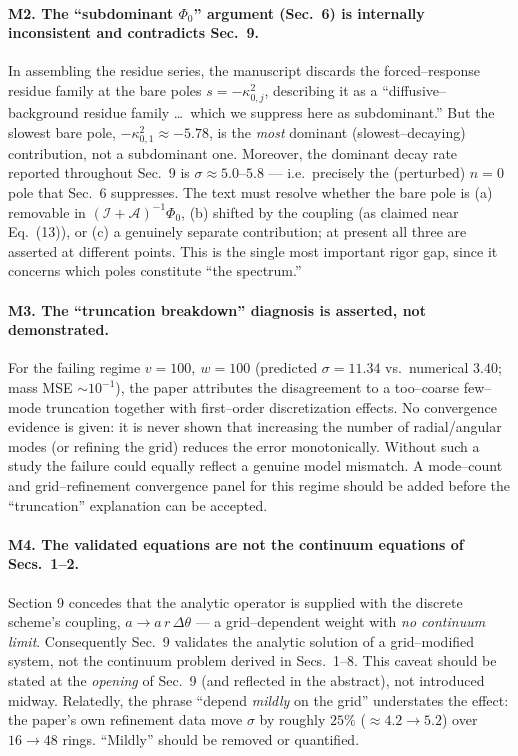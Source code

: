 \documentclass{article}
\begin{document}
\paragraph{M2. The ``subdominant $\Phi_0$'' argument (Sec.~6) is internally
inconsistent and contradicts Sec.~9.}
In assembling the residue series, the manuscript discards the forced--response
residue family at the bare poles $s=-\kappa_{0,j}^2$, describing it as a
``diffusive--background residue family \dots\ which we suppress here as
subdominant.'' But the slowest bare pole, $-\kappa_{0,1}^2\approx-5.78$, is the
\emph{most} dominant (slowest--decaying) contribution, not a subdominant one.
Moreover, the dominant decay rate reported throughout Sec.~9 is
$\sigma\approx 5.0\text{--}5.8$ --- i.e.\ precisely the (perturbed) $n=0$ pole that
Sec.~6 suppresses. The text must resolve whether the bare pole is (a) removable in
$(\mathcal I+\mathcal A)^{-1}\Phi_0$, (b) shifted by the coupling (as claimed near
Eq.~(13)), or (c) a genuinely separate contribution; at present all three are
asserted at different points. This is the single most important rigor gap, since
it concerns which poles constitute ``the spectrum.''

\paragraph{M3. The ``truncation breakdown'' diagnosis is asserted, not
demonstrated.}
For the failing regime $v=100,\ w=100$ (predicted $\sigma=11.34$ vs.\ numerical
$3.40$; mass MSE $\sim10^{-1}$), the paper attributes the disagreement to a
too--coarse few--mode truncation together with first--order discretization
effects. No convergence evidence is given: it is never shown that increasing the
number of radial/angular modes (or refining the grid) reduces the error
monotonically. Without such a study the failure could equally reflect a genuine
model mismatch. A mode--count and grid--refinement convergence panel for this
regime should be added before the ``truncation'' explanation can be accepted.

\paragraph{M4. The validated equations are not the continuum equations of
Secs.~1--2.}
Section 9 concedes that the analytic operator is supplied with the discrete
scheme's coupling, $a \to a\,r\,\Delta\theta$ --- a grid--dependent weight with
\emph{no continuum limit}. Consequently Sec.~9 validates the analytic solution of
a grid--modified system, not the continuum problem derived in Secs.~1--8. This
caveat should be stated at the \emph{opening} of Sec.~9 (and reflected in the
abstract), not introduced midway. Relatedly, the phrase ``depend \emph{mildly} on
the grid'' understates the effect: the paper's own refinement data move $\sigma$
by roughly $25\%$ ($\approx4.2\to5.2$) over $16\to48$ rings. ``Mildly'' should be
removed or quantified.
\end{document}
